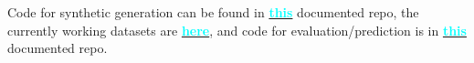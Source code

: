 \vspace{-0.5em}
Code for synthetic generation can be found in 
\textbf{\href{https://github.com/nrewkowski/COMP755FinalProject}{\textcolor{cyan}{this}}} documented repo, the currently working datasets are \textbf{\href{https://drive.google.com/open?id=1u3nhJQRcSctHzwoECYRtkN0MXC4qqPQq}{\textcolor{cyan}{here}}},
and code for evaluation/prediction is in
\textbf{\href{https://github.com/FloralZhao/Comp755Project}{\textcolor{cyan}{this}}} documented repo.
\vspace{-0.5em}
